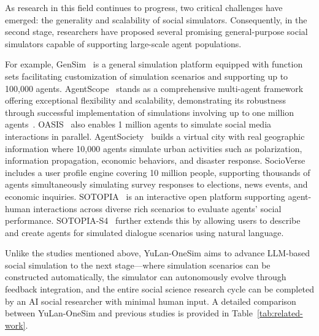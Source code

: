 \documentclass{article}
\theoremstyle{definition}
\theoremstyle{theorem}
\theoremstyle{proof}
\theoremstyle{remark}
\begin{document}
    As research in this field continues to progress, two critical challenges have emerged: the generality and scalability of social simulators. Consequently, in the second stage, researchers have proposed several promising general-purpose social simulators capable of supporting large-scale agent populations.
    
    For example, GenSim~\cite{gensim} is a general simulation platform equipped with function sets facilitating customization of simulation scenarios and supporting up to 100,000 agents. AgentScope~\cite{gao2024agentscope} stands as a comprehensive multi-agent framework offering exceptional flexibility and scalability, demonstrating its robustness through successful implementation of simulations involving up to one million agents~\cite{pan2024very}.
    OASIS~\cite{oasis} also enables 1 million agents to simulate social media interactions in parallel. AgentSociety~\cite{agentsociety} builds a virtual city with real geographic information where 10,000 agents simulate urban activities such as polarization, information propagation, economic behaviors, and disaster response. SocioVerse~\cite{zhang2025socioverse} includes a user profile engine covering 10 million people, supporting thousands of agents simultaneously simulating survey responses to elections, news events, and economic inquiries. SOTOPIA~\cite{zhou2023sotopia} is an interactive open platform supporting agent-human interactions across diverse rich scenarios to evaluate agents' social performance. SOTOPIA-S4~\cite{zhou2025sotopia} further extends this by allowing users to describe and create agents for simulated dialogue scenarios using natural language.


    Unlike the studies mentioned above, YuLan-OneSim aims to advance LLM-based social simulation to the next stage—where simulation scenarios can be constructed automatically, the simulator can autonomously evolve through feedback integration, and the entire social science research cycle can be completed by an AI social researcher with minimal human input. A detailed comparison between YuLan-OneSim and previous studies is provided in Table~\ref{tab:related-work}.
\end{document}
